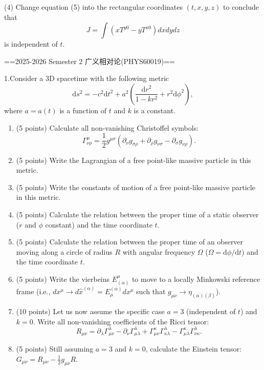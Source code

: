 (4) Change equation (5) into the rectangular coordinates $(t,x,y,z)$ to conclude that
\begin{equation}
    J=\int(xT^{y0}-yT^{x0})dxdydz
\end{equation}
is independent of $t$.


==2025-2026 Semester 2 广义相对论(PHYS60019)==

1.Consider a 3D spacetime with the following metric
\[
\mathrm{d}s^{2} = -c^{2}\mathrm{d}t^{2} + a^{2}\left(\frac{\mathrm{d}r^{2}}{1 - kr^{2}} + r^{2}\mathrm{d}\phi^{2}\right),
\]
where $a = a(t)$ is a function of $t$ and $k$ is a constant.

\begin{enumerate}
    \item[(a)] (5 points) Calculate all non-vanishing Christoffel symbols:
    \[
    \Gamma_{\nu \rho}^{\mu} = \frac{1}{2} g^{\mu \sigma}(\partial_{\nu}g_{\sigma \rho} + \partial_{\rho}g_{\nu \sigma} - \partial_{\sigma}g_{\nu \rho}).
    \]

    \item[(b)] (5 points) Write the Lagrangian of a free point-like massive particle in this metric.

    \item[(c)] (5 points) Write the constants of motion of a free point-like massive particle in this metric.

    \item[(d)] (5 points) Calculate the relation between the proper time of a static observer ($r$ and $\phi$ constant) and the time coordinate $t$.

    \item[(e)] (5 points) Calculate the relation between the proper time of an observer moving along a circle of radius $R$ with angular frequency $\Omega$ ($\Omega = \mathrm{d}\phi / \mathrm{d}t$) and the time coordinate $t$.

    \item[(f)] (5 points) Write the vierbeins $E_{(\alpha)}^{\mu}$ to move to a locally Minkowski reference frame (i.e., $dx^{\mu} \to d\hat{x}^{(\alpha)} = E_{\mu}^{(\alpha)}dx^{\mu}$ such that $g_{\mu\nu} \to \eta_{(\alpha)(\beta)}$).

    \item[(g)] (10 points) Let us now assume the specific case $a = 3$ (independent of $t$) and $k = 0$. Write all non-vanishing coefficients of the Ricci tensor:
    \[
    R_{\mu \nu} = \partial_{\lambda}\Gamma_{\mu \nu}^{\lambda} - \partial_{\nu}\Gamma_{\mu \lambda}^{\lambda} + \Gamma_{\mu \nu}^{\kappa}\Gamma_{\kappa \lambda}^{\lambda} - \Gamma_{\mu \lambda}^{\kappa}\Gamma_{\nu \kappa}^{\lambda}.
    \]

    \item[(h)] (5 points) Still assuming $a = 3$ and $k = 0$, calculate the Einstein tensor: $G_{\mu \nu} = R_{\mu \nu} - \frac{1}{2} g_{\mu \nu}R$.
\end{enumerate}


